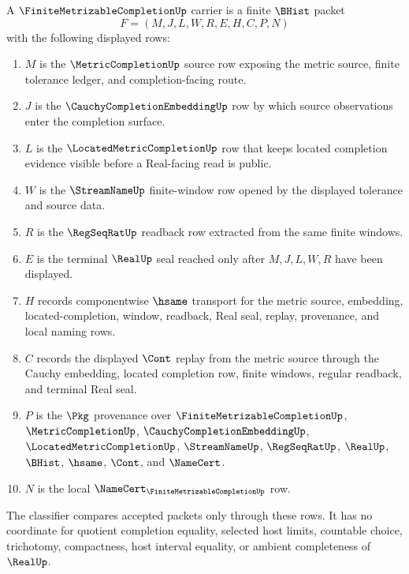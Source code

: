 \begin{definition}
\label{def:finite-metrizable-completion-carrier}
A $\FiniteMetrizableCompletionUp$ carrier is a finite $\BHist$ packet
$$
F=(M,J,L,W,R,E,H,C,P,N)
$$
with the following displayed rows:
\begin{enumerate}
\item $M$ is the $\MetricCompletionUp$ source row exposing the metric source, finite tolerance ledger, and completion-facing route.
\item $J$ is the $\CauchyCompletionEmbeddingUp$ row by which source observations enter the completion surface.
\item $L$ is the $\LocatedMetricCompletionUp$ row that keeps located completion evidence visible before a Real-facing read is public.
\item $W$ is the $\StreamNameUp$ finite-window row opened by the displayed tolerance and source data.
\item $R$ is the $\RegSeqRatUp$ readback row extracted from the same finite windows.
\item $E$ is the terminal $\RealUp$ seal reached only after $M,J,L,W,R$ have been displayed.
\item $H$ records componentwise $\hsame$ transport for the metric source, embedding, located-completion, window, readback, Real seal, replay, provenance, and local naming rows.
\item $C$ records the displayed $\Cont$ replay from the metric source through the Cauchy embedding, located completion row, finite windows, regular readback, and terminal Real seal.
\item $P$ is the $\Pkg$ provenance over $\FiniteMetrizableCompletionUp$, $\MetricCompletionUp$, $\CauchyCompletionEmbeddingUp$, $\LocatedMetricCompletionUp$, $\StreamNameUp$, $\RegSeqRatUp$, $\RealUp$, $\BHist$, $\hsame$, $\Cont$, and $\NameCert$.
\item $N$ is the local $\NameCert_{\FiniteMetrizableCompletionUp}$ row.
\end{enumerate}
The classifier compares accepted packets only through these rows. It has no coordinate for quotient completion equality, selected host limits, countable choice, trichotomy, compactness, host interval equality, or ambient completeness of $\RealUp$.
\end{definition}

